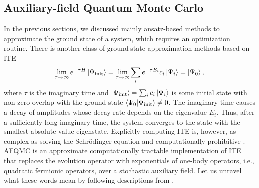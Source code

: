 \documentclass[../main.tex]{subfiles}
\begin{document}
\subsection{Auxiliary-field Quantum Monte Carlo}

In the previous sections, we discussed mainly ansatz-based methods to approximate the ground state of a system, which requires an optimization routine. There is another class of ground state approximation methods based on \ac{ITE}
\begin{equation}
     \lim_{\tau \rightarrow \infty} e^{-\tau H} \ket{\Psi_\mathrm{init}} = \lim_{\tau \rightarrow \infty} \sum_i e^{- \tau E_i} c_i \ket{\Psi_i} = \ket{\Psi_0},
\end{equation} where $\tau$ is the imaginary time and $\ket{\Psi_\mathrm{init}} =  \sum_i c_i \ket{\Psi_i} $ is some initial state with non-zero overlap with the ground state $\braket{\Psi_0}{\Psi_\mathrm{init}} \neq 0$. The imaginary time causes a decay of amplitudes whose decay rate depends on the eigenvalue $E_i$. Thus, after a sufficiently long imaginary time, the system converges to the state with the smallest absolute value eigenstate.
Explicitly computing ITE is, however, as complex as solving the Schrödinger equation and computationally prohibitive \cite{lee2022twenty}. AFQMC is an approximate computationally tractable implementation of ITE that replaces the evolution operator with exponentials of one-body operators, i.e., quadratic fermionic operators, over a stochastic auxiliary field. Let us unravel what these words mean by following descriptions from \cite{motta2018abinitio, lee2022twenty, shi2021some}.
\end{document}
